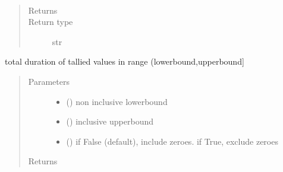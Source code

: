 \documentclass[letterpaper,10pt,english]{sphinxmanual}
\begin{document}
\begin{fulllineitems}

\begin{fulllineitems}
\label{\detokenize{Reference:salabim.Monitor.base_name}}~\begin{quote}\begin{description}
\item[{Returns}] \leavevmode
{}

\item[{Return type}] \leavevmode
str

\end{description}\end{quote}

\end{fulllineitems}


\begin{fulllineitems}
\label{\detokenize{Reference:salabim.Monitor.bin_duration}}
total duration of tallied values in range (lowerbound,upperbound{]}
\begin{quote}\begin{description}
\item[{Parameters}] \leavevmode\begin{itemize}
\item {} 
 () \textendash{} non inclusive lowerbound

\item {} 
 () \textendash{} inclusive upperbound

\item {} 
 () \textendash{} if False (default), include zeroes. if True, exclude zeroes

\end{itemize}

\item[{Returns}] \leavevmode
{}


\end{description}
\end{quote}
\end{fulllineitems}
\end{fulllineitems}
\end{document}
